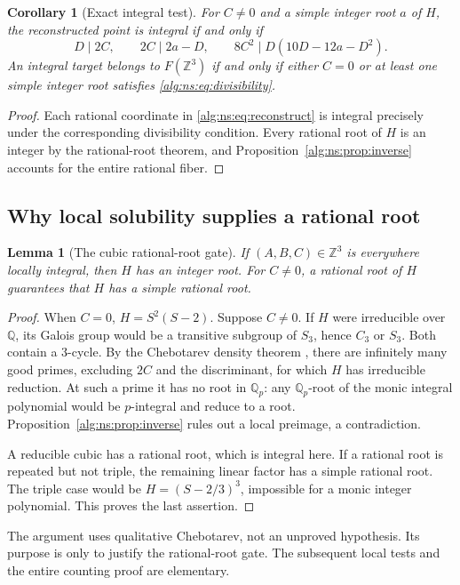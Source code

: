 \documentclass[11pt]{article}
\numberwithin{equation}{section}
\theoremstyle{plain}
\theoremstyle{plain}
\newtheorem{lemma}[lemma]{Lemma}
\theoremstyle{plain}
\newtheorem{corollary}[corollary]{Corollary}
\theoremstyle{definition}
\theoremstyle{definition}
\theoremstyle{definition}
\theoremstyle{remark}
\newcommand{\Z}{\mathbb Z}\newcommand{\Q}{\mathbb Q}
\begin{document}
\begin{corollary}[Exact integral test]\label{alg:ns:cor:integral-test}
For $C\ne0$ and a simple integer root $a$ of $H$, the reconstructed
point is integral if and only if
\begin{equation}\label{alg:ns:eq:divisibility}
D\mid2C,\qquad
2C\mid2a-D,\qquad
8C^2\mid D(10D-12a-D^2).
\end{equation}
An integral target belongs to $F(\Z^3)$ if and only if either $C=0$ or
at least one simple integer root satisfies \eqref{alg:ns:eq:divisibility}.
\end{corollary}
\begin{proof}
Each rational coordinate in \eqref{alg:ns:eq:reconstruct} is integral precisely
under the corresponding divisibility condition. Every rational root of
$H$ is an integer by the rational-root theorem, and
Proposition~\ref{alg:ns:prop:inverse} accounts for the entire rational fiber.
\end{proof}

\subsection{Why local solubility supplies a rational root}
\begin{lemma}[The cubic rational-root gate]\label{alg:ns:lem:rootgate}
If $(A,B,C)\in\Z^3$ is everywhere locally integral, then $H$ has an
integer root. For $C\ne0$, a rational root of $H$ guarantees that $H$
has a simple rational root.
\end{lemma}
\begin{proof}
When $C=0$, $H=S^2(S-2)$. Suppose $C\ne0$. If $H$ were irreducible over
$\Q$, its Galois group would be a transitive subgroup of $S_3$, hence
$C_3$ or $S_3$. Both contain a $3$-cycle. By the Chebotarev density
theorem \cite[Theorem~8.31 and Example~8.36]{milne}, there are infinitely
many good primes, excluding $2C$ and the discriminant, for which $H$
has irreducible reduction. At such a prime it has no root in $\Q_p$:
any $\Q_p$-root of the monic integral polynomial would be $p$-integral
and reduce to a root. Proposition~\ref{alg:ns:prop:inverse} rules out a local
preimage, a contradiction.

A reducible cubic has a rational root, which is integral here. If a
rational root is repeated but not triple, the remaining linear factor
has a simple rational root. The triple case would be
$H=(S-2/3)^3$, impossible for a monic integer polynomial. This proves
the last assertion.
\end{proof}
The argument uses qualitative Chebotarev, not an unproved hypothesis.
Its purpose is only to justify the rational-root gate. The subsequent
local tests and the entire counting proof are elementary.
\end{document}
